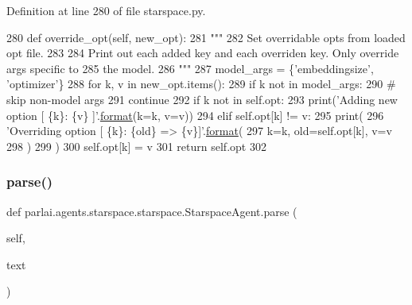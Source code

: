 Definition at line 280 of file starspace.\+py.


\begin{DoxyCode}
280     \textcolor{keyword}{def }override\_opt(self, new\_opt):
281         \textcolor{stringliteral}{"""}
282 \textcolor{stringliteral}{        Set overridable opts from loaded opt file.}
283 \textcolor{stringliteral}{}
284 \textcolor{stringliteral}{        Print out each added key and each overriden key. Only override args specific to}
285 \textcolor{stringliteral}{        the model.}
286 \textcolor{stringliteral}{        """}
287         model\_args = \{\textcolor{stringliteral}{'embeddingsize'}, \textcolor{stringliteral}{'optimizer'}\}
288         \textcolor{keywordflow}{for} k, v \textcolor{keywordflow}{in} new\_opt.items():
289             \textcolor{keywordflow}{if} k \textcolor{keywordflow}{not} \textcolor{keywordflow}{in} model\_args:
290                 \textcolor{comment}{# skip non-model args}
291                 \textcolor{keywordflow}{continue}
292             \textcolor{keywordflow}{if} k \textcolor{keywordflow}{not} \textcolor{keywordflow}{in} self.opt:
293                 print(\textcolor{stringliteral}{'Adding new option [ \{k\}: \{v\} ]'}.\hyperlink{namespaceparlai_1_1chat__service_1_1services_1_1messenger_1_1shared__utils_a32e2e2022b824fbaf80c747160b52a76}{format}(k=k, v=v))
294             \textcolor{keywordflow}{elif} self.opt[k] != v:
295                 print(
296                     \textcolor{stringliteral}{'Overriding option [ \{k\}: \{old\} => \{v\}]'}.\hyperlink{namespaceparlai_1_1chat__service_1_1services_1_1messenger_1_1shared__utils_a32e2e2022b824fbaf80c747160b52a76}{format}(
297                         k=k, old=self.opt[k], v=v
298                     )
299                 )
300             self.opt[k] = v
301         \textcolor{keywordflow}{return} self.opt
302 
\end{DoxyCode}
\mbox{\label{classparlai_1_1agents_1_1starspace_1_1starspace_1_1StarspaceAgent_ab08bd065e56f11ebe2ad30d3894c46c7}} 
\subsubsection{\texorpdfstring{parse()}{parse()}}
{\footnotesize\ttfamily def parlai.\+agents.\+starspace.\+starspace.\+Starspace\+Agent.\+parse (\begin{DoxyParamCaption}\item[{}]{self,  }\item[{}]{text }\end{DoxyParamCaption})}

